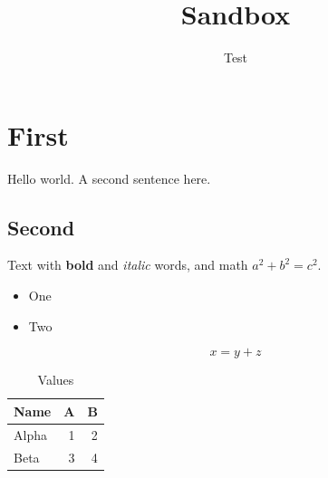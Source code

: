\documentclass[11pt]{article}
\title{Sandbox}
\author{Test}
\begin{document}
\maketitle

\section{First}
\label{sec:first}
Hello world. A second sentence here.

\subsection{Second}
\label{sec:second}
Text with \textbf{bold} and \emph{italic} words, and math $a^2+b^2=c^2$.

\begin{itemize}
  \item One
  \item Two
\end{itemize}

\begin{equation}
  \label{eq:x}
  x = y + z
\end{equation}

\begin{table}[htbp]
  \centering
  \caption{Values}
  \label{tab:values}
  \begin{tabular}{lrr}
    \toprule
    Name & A & B \\
    \midrule
    Alpha & 1 & 2 \\
    Beta & 3 & 4 \\
    \bottomrule
  \end{tabular}
\end{table}
\end{document}
